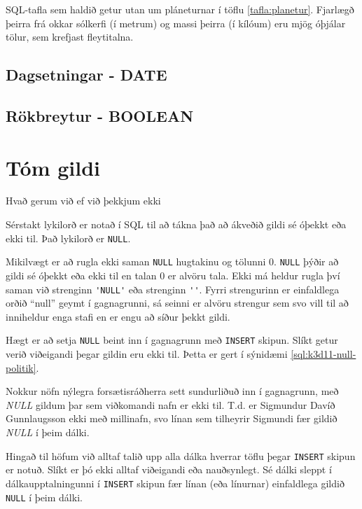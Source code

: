 \begin{example}
\caption[Plánetur]{SQL-tafla sem haldið getur utan um pláneturnar í töflu \ref{tafla:planetur}. Fjarlægð þeirra frá okkar sólkerfi (í metrum) og massi þeirra (í kílóum) eru mjög óþjálar tölur, sem krefjast fleytitalna.}
\label{sql:k3d7-planetur}
\centering
{}
\end{example}

\subsection{Dagsetningar - DATE}

\subsection{Rökbreytur - BOOLEAN}

\section{Tóm gildi} %
Hvað gerum við ef við þekkjum ekki 

Sérstakt lykilorð er notað í SQL til að tákna það að ákveðið gildi sé óþekkt eða ekki til. Það lykilorð er \verb|NULL|.

Mikilvægt er að rugla ekki saman \verb|NULL| hugtakinu og tölunni $0$. \verb|NULL| þýðir að gildi sé óþekkt eða ekki til en talan $0$ er alvöru tala. Ekki má heldur rugla því saman við strenginn \verb|'NULL'| eða strenginn \verb|''|. Fyrri strengurinn er einfaldlega orðið ``null'' geymt í gagnagrunni, sá seinni er alvöru strengur sem svo vill til að inniheldur enga stafi en er engu að síður þekkt gildi.

Hægt er að setja \verb|NULL| beint inn í gagnagrunn með \verb|INSERT| skipun. Slíkt getur verið viðeigandi þegar gildin eru ekki til. Þetta er gert í sýnidæmi \ref{sql:k3d11-null-politik}.

\begin{example}
\caption[Mannanöfn]{Nokkur nöfn nýlegra forsætisráðherra sett sundurliðuð inn í gagnagrunn, með \emph{NULL} gildum þar sem viðkomandi nafn er ekki til. T.d. er Sigmundur Davíð Gunnlaugsson ekki með millinafn, svo línan sem tilheyrir Sigmundi fær gildið \emph{NULL} í þeim dálki.}
\label{sql:k3d11-null-politik}
\centering
{}
\end{example}

Hingað til höfum við alltaf talið upp alla dálka hverrar töflu þegar \verb|INSERT| skipun er notuð. Slíkt er þó ekki alltaf viðeigandi eða nauðsynlegt. Sé dálki sleppt í dálkaupptalningunni í \verb|INSERT| skipun fær línan (eða línurnar) einfaldlega gildið \verb|NULL| í þeim dálki.

